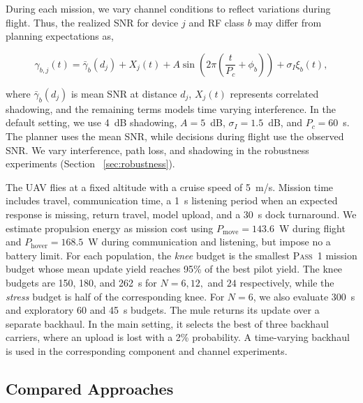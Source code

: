 \documentclass[conference]{IEEEtran}
\begin{document}
During each mission, we vary channel conditions to reflect variations during flight. Thus, the realized SNR for device 
 \(j\)  and RF class 
\(b\) may differ from planning expectations as,

\begin{equation}
\gamma_{b,j}(t)
=
\bar{\gamma}_{b}(d_j)
+
X_j(t)
+
A\sin\!\left(2\pi\left(\frac{t}{P_c}+\phi_b\right)\right)
+
\sigma_I\xi_b(t),
\label{eq:channel-model}
\end{equation}

where \(\bar{\gamma}_{b}(d_j)\) is mean SNR at distance \(d_j\),
\(X_j(t)\) represents correlated shadowing, and the remaining terms models
time varying interference. In the default setting, we use 4~dB shadowing,
\(A=5\)~dB, \(\sigma_I=1.5\)~dB, and \(P_c=60\)~s. The planner uses the
mean SNR, while decisions during flight use the observed SNR. We vary
interference, path loss, and shadowing in the robustness experiments (Section ~\ref{sec:robustness}).

The UAV flies at a fixed altitude with a cruise speed of 5~m/s. Mission time
includes travel, communication time, a 1~s listening period when an expected
response is missing, return travel, model upload, and a 30~s dock turnaround.
We estimate propulsion energy as mission cost using
\(P_{\mathrm{move}}=143.6\)~W during flight and
\(P_{\mathrm{hover}}=168.5\)~W during communication and listening, but impose no a battery limit. For each population, the \emph{knee} budget is the smallest \textsc{Pass~1} mission
budget whose mean update yield reaches 95\% of the best pilot yield. The knee
budgets are 150, 180, and 262~s for \(N=6,12,\) and \(24\) respectively, while the
\emph{stress} budget is half of the corresponding knee. For \(N=6\), we also
evaluate 300~s and exploratory 60 and 45~s budgets. The mule returns its update over a separate backhaul. In the main setting, it
selects the best of three backhaul carriers, where an upload is lost with a 2\% probability. A
time-varying backhaul is used in the corresponding component and channel
experiments.

\subsection{Compared Approaches}
\label{sec:baselines}

\end{document}
